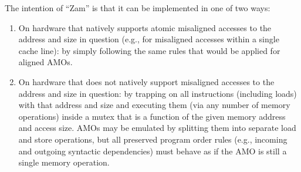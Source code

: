 \begin{commentary}
  The intention of ``Zam'' is that it can be implemented in one of two ways:
  \begin{enumerate}
    \item On hardware that natively supports atomic misaligned accesses to the address and size in question (e.g., for misaligned accesses within a single cache line): by simply following the same rules that would be applied for aligned AMOs.
    \item On hardware that does not natively support misaligned accesses to the address and size in question: by trapping on all instructions (including loads) with that address and size and executing them (via any number of memory operations) inside a mutex that is a function of the given memory address and access size.  AMOs may be emulated by splitting them into separate load and store operations, but all preserved program order rules (e.g., incoming and outgoing syntactic dependencies) must behave as if the AMO is still a single memory operation.
  \end{enumerate}
\end{commentary}
